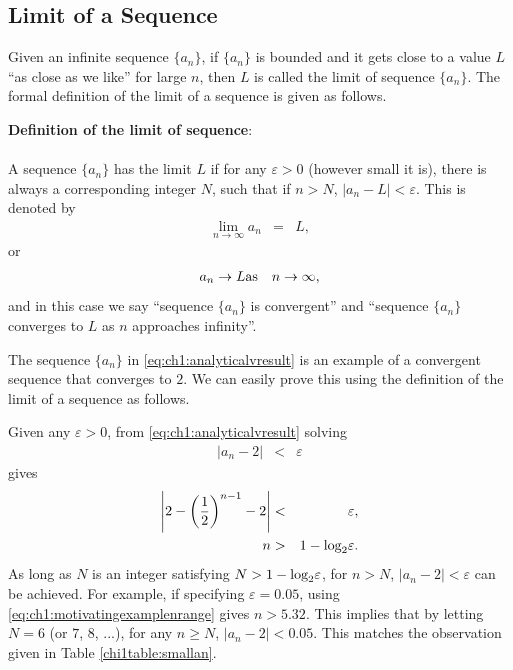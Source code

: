 \subsection{Limit of a Sequence} \label{ch1subsec:definationoflimitofsequence}

Given an infinite sequence $\{a_n\}$, if $\{a_n\}$ is bounded and it gets close to a value $L$ ``as close as we like'' for large $n$, then $L$ is called the limit of sequence $\{a_n\}$. The formal definition of the limit of a sequence is given as follows.

\begin{VF}
\textbf{Definition of the limit of sequence}:
\\
\\
\noindent A sequence $\{a_n\}$ has the limit $L$ if for any $\varepsilon > 0$ (however small it is), there is always a corresponding integer $N$, such that if $n>N$, $|a_n-L|<\varepsilon$. This is denoted by
\begin{eqnarray}
  \lim_{n\rightarrow \infty} a_n &=& L, \nonumber
\end{eqnarray}
or
\begin{eqnarray}
  a_n \rightarrow L  & \textup{as} & n \rightarrow \infty, \nonumber
\end{eqnarray}
and in this case we say ``sequence $\{a_n\}$ is convergent'' and ``sequence $\{a_n\}$ converges to $L$ as $n$ approaches infinity''.
\end{VF}

The sequence $\{a_n\}$ in \eqref{eq:ch1:analyticalvresult} is an example of a convergent sequence that converges to $2$. We can easily prove this using the definition of the limit of a sequence as follows.

Given any $\varepsilon > 0$, from \eqref{eq:ch1:analyticalvresult} solving
\begin{eqnarray}
  |a_n - 2| &<& \varepsilon \nonumber
\end{eqnarray}
gives
\begin{eqnarray}
  \left|2-\left(\frac{1}{2}\right)^{n-1}-2\right| &<& \varepsilon, \nonumber \\
  n &>& 1-\textup{log}_2\varepsilon. \label{eq:ch1:motivatingexamplenrange}
\end{eqnarray}
As long as $N$ is an integer satisfying $N > 1-\textup{log}_2\varepsilon$, for $n > N$, $|a_n - 2| < \varepsilon$ can be achieved. For example, if specifying $\varepsilon = 0.05$, using \eqref{eq:ch1:motivatingexamplenrange} gives $n>5.32$. This implies that by letting $N = 6$ (or $7$, $8$, ...), for any $n \geq N$, $|a_n-2|<0.05$. This matches the observation given in Table \ref{chi1table:smallan}.

